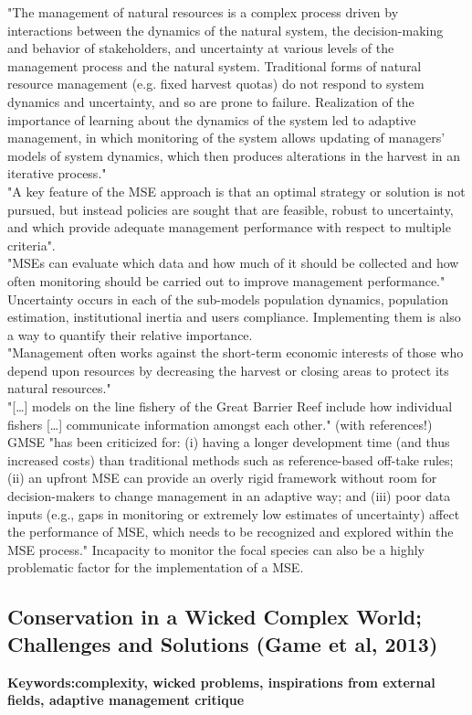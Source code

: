 \documentclass[12pt]{article}
\begin{document}
"The management of natural resources is a complex process driven by interactions between the dynamics of the natural system, the decision-making and behavior of stakeholders, and uncertainty at various levels of the management process and the natural system. Traditional forms of natural resource management (e.g. fixed harvest quotas) do not respond to system dynamics and uncertainty, and so are prone to failure. Realization of the importance of learning about the dynamics of the system led to adaptive management, in which monitoring of the system allows updating of managers’ models of system dynamics, which then produces alterations in the harvest in an iterative process."\\
"A key feature of the MSE approach is that an optimal strategy or solution is not pursued, but instead policies are sought that are feasible, robust to uncertainty, and which provide adequate management performance with respect to multiple criteria".\\
"MSEs can evaluate which data and how much of it should be collected and how often monitoring should be carried out to improve management performance."\\
Uncertainty occurs in each of the sub-models population dynamics, population estimation, institutional inertia and users compliance. Implementing them is also a way to quantify their relative importance.\\
"Management often works against the short-term economic interests of those who depend upon resources by decreasing the harvest or closing areas to protect its natural resources."\\
"[\dots] models on the line fishery of the Great Barrier Reef include how individual fishers [\dots] communicate
information amongst each other." (with references!)\\
GMSE "has been criticized for: (i) having a longer development time (and thus increased costs) than traditional methods such as reference-based off-take rules; (ii) an upfront MSE can provide an overly rigid framework without room for decision-makers to change management in an adaptive way; and (iii) poor data inputs (e.g., gaps in monitoring or extremely low estimates of uncertainty) affect the performance of MSE, which needs to be recognized and explored within the MSE process." Incapacity to monitor the focal species can also be a highly problematic factor for the implementation of a MSE.

\subsection{Conservation in a Wicked Complex World; Challenges and Solutions (Game et al, 2013)}
\textbf{Keywords:complexity, wicked problems, inspirations from external fields, adaptive management critique}
\end{document}
